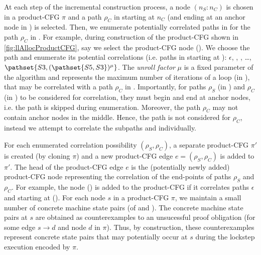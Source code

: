 At each step of the incremental construction process, a node $(n_S\!:\!n_C)$ is chosen in a product-CFG $\pi$
and a path $\rho_C$ in \cprog{} starting at $n_C$ (and ending at an anchor node in \cprog{}) is selected.
Then, we enumerate potentially correlated paths in \sprog{} for the path $\rho_C$ in \cprog{}.
For example, during construction of the product-CFG shown in \cref{fig:llAllocProductCFG},
say we select the product-CFG node ().
We choose the \cprog{} path  and enumerate its potential correlations (i.e. paths in \sprog{} starting at ):
$\epsilon$, , , \ldots, $\pathset{S3,(\pathset{S5,S3})^\mu}$.
The {\em unroll factor} $\mu$ is a fixed parameter of the algorithm and represents the maximum number of iterations of a loop (in \sprog{}),
that may be correlated with a path $\rho_C$ in \cprog{}.
Importantly, for paths $\rho_S$ (in \sprog{}) and $\rho_C$ (in \cprog{}) to be considered for correlation,
they must begin and end at anchor nodes, i.e. the path  is skipped during enumeration.
Moreover, the path $\rho_C$ may not contain anchor nodes in the middle.
Hence, the path  is not considered for $\rho_C$,
instead we attempt to correlate the subpaths  and  individually.

For each enumerated correlation possibility $(\rho_S,\rho_C)$, a separate product-CFG $\pi'$ is
created (by cloning $\pi$) and a new product-CFG edge $e=(\rho_S,\rho_C)$ is added to $\pi'$.
The head of the product-CFG edge $e$ is the (potentially newly added) product-CFG node representing
the correlation of the end-points of paths $\rho_S$ and $\rho_C$. For example, the node () is added
to the product-CFG if it correlates paths $\epsilon$ and  starting at ().
For each node $s$ in a product-CFG $\pi$, we maintain a small number of
concrete machine state pairs (of \sprog{} and \cprog{}).
The concrete machine state pairs at $s$ are obtained as counterexamples to an unsucessful proof
obligation  (for some edge $s \rightarrow d$ and node $d$ in $\pi$).
Thus, by construction, these counterexamples represent concrete state pairs that may potentially occur
at $s$ during the lockstep execution encoded by $\pi$.

